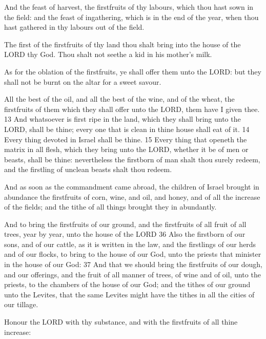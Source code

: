 			\begin{compactdesc}
				\item[Exodus 23:16] And the feast of harvest, the firstfruits of thy labours, which thou hast sown in the field: and the feast of ingathering, which is in the end of the year, when thou hast gathered in thy labours out of the field.
				\item[Exodus 23:19] The first of the firstfruits of thy land thou shalt bring into the house of the LORD thy God. Thou shalt not seethe a kid in his mother's milk.
				\item[Leviticus 2:12] As for the oblation of the firstfruits, ye shall offer them unto the LORD: but they shall not be burnt on the altar for a sweet savour.
				\item[Numbers 18:12--15] All the best of the oil, and all the best of the wine, and of the wheat, the firstfruits of them which they shall offer unto the LORD, them have I given thee. 13 And whatsoever is first ripe in the land, which they shall bring unto the LORD, shall be thine; every one that is clean in thine house shall eat of it. 14 Every thing devoted in Israel shall be thine. 15 Every thing that openeth the matrix in all flesh, which they bring unto the LORD, whether it be of men or beasts, shall be thine: nevertheless the firstborn of man shalt thou surely redeem, and the firstling of unclean beasts shalt thou redeem.
				\item[2 Chronicles 31:5] And as soon as the commandment came abroad, the children of Israel brought in abundance the firstfruits of corn, wine, and oil, and honey, and of all the increase of the fields; and the tithe of all things brought they in abundantly.
				\item[Nehemiah 10:35--37] And to bring the firstfruits of our ground, and the firstfruits of all fruit of all trees, year by year, unto the house of the LORD 36 Also the firstborn of our sons, and of our cattle, as it is written in the law, and the firstlings of our herds and of our flocks, to bring to the house of our God, unto the priests that minister in the house of our God: 37 And that we should bring the firstfruits of our dough, and our offerings, and the fruit of all manner of trees, of wine and of oil, unto the priests, to the chambers of the house of our God; and the tithes of our ground unto the Levites, that the same Levites might have the tithes in all the cities of our tillage.
				\item[Proverbs 3:9] Honour the LORD with thy substance, and with the firstfruits of all thine increase:

\end{compactdesc}
